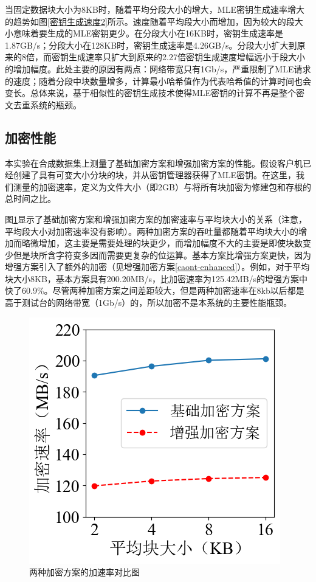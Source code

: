 \documentclass[promaster]{thesis-uestc}
\begin{document}
当固定数据块大小为8KB时，随着平均分段大小的增大，MLE密钥生成速率增大的趋势如图\ref{密钥生成速度2}所示。速度随着平均段大小而增加，因为较大的段大小意味着要生成的MLE密钥更少。在分段大小在16KB时，密钥生成速率是1.87GB/s；分段大小在128KB时，密钥生成速率是4.26GB/s。分段大小扩大到原来的8倍，而密钥生成速率只扩大到原来的2.27倍密钥生成速度增幅远小于段大小的增加幅度。此处主要的原因有两点：网络带宽只有1Gb/s，严重限制了MLE请求的速度；随着分段中块数量增多，计算最小哈希值作为代表哈希值的计算时间也会变长。总体来说，基于相似性的密钥生成技术使得MLE密钥的计算不再是整个密文去重系统的瓶颈。

\subsection{加密性能}\label{加密性能}
本实验在合成数据集上测量了基础加密方案和增强加密方案的性能。假设客户机已经创建了具有可变大小分块的块，并从密钥管理器获得了MLE密钥。在这里，我们测量的加密速率，定义为文件大小（即2GB）与将所有块加密为修建包和存根的总时间之比。

图\ref{两种加密方案的加速率对比图}显示了基础加密方案和增强加密方案的加密速率与平均块大小的关系（注意，平均段大小对加密速率没有影响）。两种加密方案的吞吐量都随着平均块大小的增加而略微增加，这主要是需要处理的块更少，而增加幅度不大的主要是即使块数变少但是块所含字符变多因而需要更复杂的位运算。基本方案比增强方案更快，因为增强方案引入了额外的加密（见增强加密方案\ref{caont-enhanced}）。例如，对于平均块大小8KB，基本方案具有200.20MB/s，比加密速率为125.42MB/s的增强方案中快了60.9\%。尽管两种加密方案之间差距较大，但是两种加密速率在8kb以后都是高于测试台的网络带宽（1Gb/s）的，所以加密不是本系统的主要性能瓶颈。
\begin{figure}[ht]
    \centering
    \includegraphics[width = 0.40\linewidth]{pic/jiamisulv.png}
    \caption{两种加密方案的加速率对比图}
    \label{两种加密方案的加速率对比图}
\end{figure}
\end{document}
